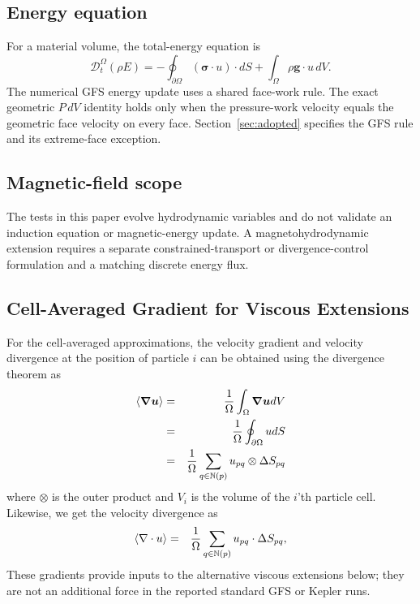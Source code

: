 \documentclass[twocolumn]{aastex63}
\newcommand{\vel}{{u}}
\newcommand{\surf}[0]{S}
\newcommand{\gradT}[1]{\boldsymbol{\nabla#1}}
\begin{document}
\subsection{Energy equation}
For a material volume, the total-energy equation is
\begin{equation}
  \mathcal{D}_t^\Omega(\rho E)
  =-\oint_{\partial\Omega}
    (\boldsymbol{\sigma}\cdot\vel)\cdot d\surf
   +\int_\Omega\rho\boldsymbol{g}\cdot\vel\,dV.
\end{equation}
The numerical GFS energy update uses a shared face-work rule. The exact
geometric $P\,dV$ identity holds only when the pressure-work velocity equals
the geometric face velocity on every face. Section~\ref{sec:adopted}
specifies the GFS rule and its extreme-face exception.

\subsection{Magnetic-field scope}
The tests in this paper evolve hydrodynamic variables and do not validate an
induction equation or magnetic-energy update. A magnetohydrodynamic extension
requires a separate constrained-transport or divergence-control formulation
and a matching discrete energy flux.

\subsection{Cell-Averaged Gradient for Viscous Extensions}

For the cell-averaged approximations, the velocity gradient and velocity divergence at the position of particle $i$ can be obtained using the divergence theorem as
\begin{eqnarray}
	\left<\gradT{u}\right> &=& {1\over \Omega} \int_\Omega \gradT{u} dV \\ 
	&=& {1\over \Omega} \oint_{\partial\Omega} \vel d\surf \\
	&=&{1\over \Omega} \sum_{q\in \mathbb{N}(p)} \vel_{pq}\otimes \Delta \surf_{pq} \\
	\end{eqnarray}	
	where $\otimes$ is the outer product and $V_i$ is the volume of the $i$'th particle cell.
Likewise, we get the velocity divergence as
	\begin{eqnarray}
	\left<\nabla\cdot\vel\right> &=& {1\over \Omega}\sum_{q\in\mathbb{N}(p)} \vel_{pq}\cdot \Delta \surf_{pq},
\end{eqnarray}	
These gradients provide inputs to the alternative viscous extensions below;
they are not an additional force in the reported standard GFS or Kepler runs.
\end{document}
